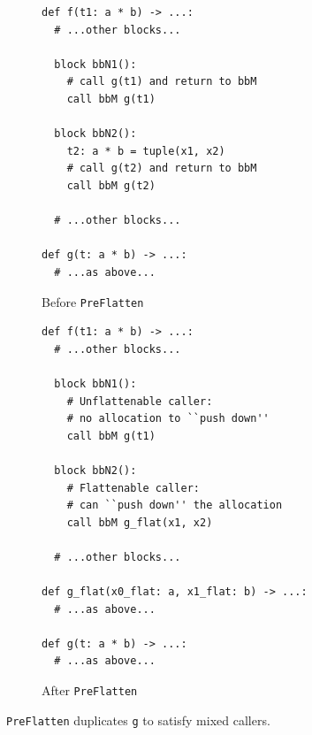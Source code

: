 \begin{figure}[htbp]
  \centering
  \begin{subfigure}[t]{0.48\textwidth}
    \caption{Before \texttt{PreFlatten}}
    \label{fig:pre_flatten_dup_before}
    \vspace{1mm}
\begin{verbatim}
def f(t1: a * b) -> ...:
  # ...other blocks...

  block bbN1():
    # call g(t1) and return to bbM
    call bbM g(t1)

  block bbN2():
    t2: a * b = tuple(x1, x2)
    # call g(t2) and return to bbM
    call bbM g(t2)

  # ...other blocks...

def g(t: a * b) -> ...:
  # ...as above...
\end{verbatim}
  \end{subfigure}\hfill
  \begin{subfigure}[t]{0.48\textwidth}
    \caption{After \texttt{PreFlatten}}
    \label{fig:pre_flatten_dup_after}
    \vspace{1mm}
\begin{verbatim}
def f(t1: a * b) -> ...:
  # ...other blocks...

  block bbN1():
    # Unflattenable caller:
    # no allocation to ``push down''
    call bbM g(t1)

  block bbN2():
    # Flattenable caller:
    # can ``push down'' the allocation
    call bbM g_flat(x1, x2)

  # ...other blocks...

def g_flat(x0_flat: a, x1_flat: b) -> ...:
  # ...as above...

def g(t: a * b) -> ...:
  # ...as above...
\end{verbatim}
  \end{subfigure}
  \caption{\texttt{PreFlatten} duplicates \texttt{g} to satisfy mixed callers.}
  \label{fig:pre_flatten_example_dup}
\end{figure}





